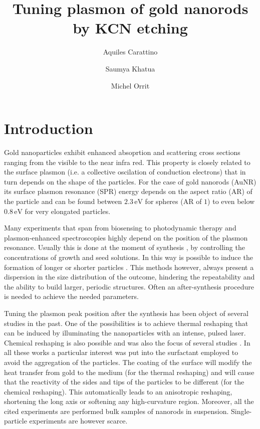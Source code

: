 \documentclass{article}
\title{Tuning plasmon of gold nanorods by KCN etching}
\author{Aquiles Carattino \and Saumya Khatua \and Michel
Orrit}
\begin{document}
\maketitle
{}

\section{Introduction}
Gold nanoparticles exhibit enhanced absoprtion and scattering cross sections
ranging from the visible to the near infra red. This property is closely related
to the surface plasmon (i.e. a collective oscilation of conduction electrons)
that in turn depends on the shape of the particles. For the case of gold
nanorods (AuNR) its surface plasmon resonance (SPR) energy depends on the aspect
ratio (AR) of the particle and can be found between $2.3\,\textrm{eV}$ for
spheres (AR of $1$) to even below $0.8\,\textrm{eV}$ for very elongated
particles.

Many experiments that span from biosensing \cite{Zijlstra2012} to photodynamic
therapy \cite{Zhao2014} and plasmon-enhanced spectroscopies \cite{Sivapalan2013}
highly depend on the position of the plasmon resonance. Usually this is done at
the moment of synthesis \cite{Gou2005}, by controlling the concentrations of
growth and seed solutions. In this way is possible to induce the formation of
longer or shorter particles \cite{Nikoobakht2003}. This methods however, always
present a dispersion in the size distribution of the outcome, hindering the
repeatability and the ability to build larger, periodic structures. Often an
after-synthesis procedure is needed to achieve the needed parameters.

Tuning the plasmon peak position after the synthesis has been object of several
studies in the past. One of the possibilities is to achieve thermal reshaping
that can be induced by illuminating the nanoparticles with an intense, pulsed
laser\cite{Link2000}\cite{Horiguchi2008}. Chemical reshaping is also possible
and was also the focus of several studies\cite{Yuan2015}
\cite{Carbo-Argibay2007} \cite{Rodriguez-Fernandez2005} \cite{Jana2002}. In all
these works a particular interest was put into the surfactant employed to avoid
the aggregation of the particles. The coating of the surface will modify the
heat transfer from gold to the medium (for the thermal reshaping) and will cause
that the reactivity of the sides and tips of the particles to be different (for
the chemical reshaping). This automatically leads to an anisotropic reshaping,
shortening the long axis or softening any high-curvature region. Moreover, all
the cited experiments are performed bulk samples of nanorods in suspension.
Single-particle experiments are however scarce.
\end{document}
